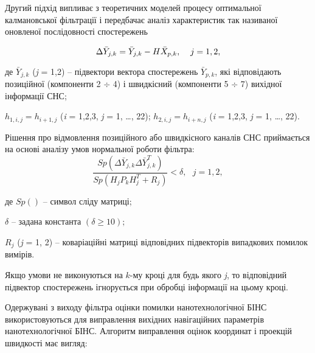 Другий підхід випливає з теоретичних моделей процесу оптимальної калмановської фільтрації 
і передбачає аналіз характеристик так називаної оновленої послідовності спостережень

\begin{equation} 
\label{eq:y_calc} 
\Delta \bar{Y}_{j,k} =\bar{Y}_{j,k} -H\bar{X}_{p,k} ,{\rm \; \; \; \; }j={\rm 1,2,} \end{equation} 

де  $\bar{Y}_{j,k} $ (\textit{j} = 1,2) -- підвектори вектора спостережень $\bar{Y}_{p,k} $, 
які відповідають позиційної (компоненти 2 $\div $ 4) і швидкісний (компоненти  5 $\div $ 7) 
вихідної інформації СНС;

$h_{1,i,j} =h_{i+1,j} $  (\textit{i} = 1,2,3,  \textit{j} = 1, \dots , 22);
$h_{2,i,j} =h_{i+n,j} $ (\textit{i} = 1,2,3, \textit{j} = 1, \dots , 22).

Рішення про відмовлення позиційного або швидкісного каналів СНС приймається на основі 
аналізу умов нормальної роботи фільтра:
\begin{equation} 
\label{eq:y_sns_otkaz}
\frac{Sp(\Delta \bar{Y}_{j,k} \Delta \bar{Y}_{j,k} ^{T} )}{Sp(H_{j} P_{k} H_{j}^{T} +R_{j} )} <\delta ,\, \, \, \, j=1,2,    
\end{equation} 
\begin{ESKDexplanation}
\item де $Sp()$ -- символ сліду матриці;
\item $\delta $ -- задана константа $(\delta \ge 10);$
\item $R_{j} $ (\textit{j} = 1, 2) -- коваріаційні матриці відповідних підвекторів випадкових помилок вимірів.
\end{ESKDexplanation}
Якщо умови не виконуються на $k$-му  кроці для будь якого \textit{j}, то відповідний 
підвектор спостережень ігнорується при обробці інформації на цьому кроці.

Одержувані з виходу фільтра оцінки помилки нанотехнологічної БІНС   використовуються 
для виправлення вихідних навігаційних параметрів нанотехнологічної БІНС. Алгоритм 
виправлення оцінок координат і проекцій швидкості має вигляд:

